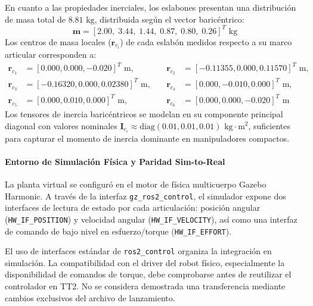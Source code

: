 \documentclass[12pt]{article}
\begin{document}
En cuanto a las propiedades inerciales, los eslabones presentan una distribución de masa total de $8.81\text{ kg}$, distribuida según el vector baricéntrico:
\begin{equation}
    \bm{m} = [2.00, \; 3.44, \; 1.44, \; 0.87, \; 0.80, \; 0.26]^T\text{ kg}
\end{equation}
Los centros de masa locales ($\bm{r}_{c_i}$) de cada eslabón medidos respecto a su marco articular corresponden a:
\begin{equation}
\begin{aligned}
    \bm{r}_{c_1} &= [0.000, 0.000, -0.020]^T\text{ m}, \quad & \bm{r}_{c_2} &= [-0.11355, 0.000, 0.11570]^T\text{ m}, \\
    \bm{r}_{c_3} &= [-0.16320, 0.000, 0.02380]^T\text{ m}, \quad & \bm{r}_{c_4} &= [0.000, -0.010, 0.000]^T\text{ m}, \\
    \bm{r}_{c_5} &= [0.000, 0.010, 0.000]^T\text{ m}, \quad & \bm{r}_{c_6} &= [0.000, 0.000, -0.020]^T\text{ m}
\end{aligned}
\end{equation}
Los tensores de inercia baricéntricos se modelan en su componente principal diagonal con valores nominales $\bm{I}_{c_i} \approx \text{diag}(0.01, 0.01, 0.01)\text{ kg}\cdot\text{m}^2$, suficientes para capturar el momento de inercia dominante en manipuladores compactos.

\paragraph{Entorno de Simulación Física y Paridad Sim-to-Real}
La planta virtual se configuró en el motor de física multicuerpo Gazebo Harmonic. A través de la interfaz \texttt{gz\_ros2\_control}, el simulador expone dos interfaces de lectura de estado por cada articulación: posición angular (\texttt{HW\_IF\_POSITION}) y velocidad angular (\texttt{HW\_IF\_VELOCITY}), así como una interfaz de comando de bajo nivel en esfuerzo/torque (\texttt{HW\_IF\_EFFORT}). 

El uso de interfaces estándar de \texttt{ros2\_control} organiza la integración en simulación. La compatibilidad con el driver del robot físico, especialmente la disponibilidad de comandos de torque, debe comprobarse antes de reutilizar el controlador en TT2. No se considera demostrada una transferencia mediante cambios exclusivos del archivo de lanzamiento.
\end{document}
